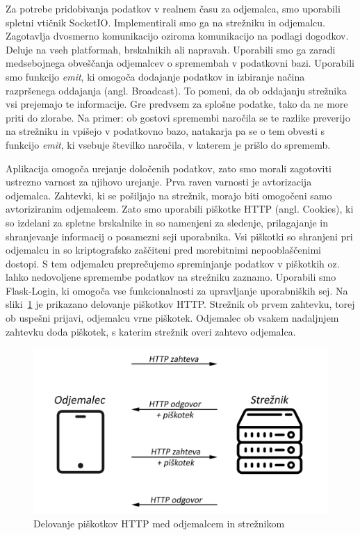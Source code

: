 \documentclass[a4paper, 12pt]{book}
\begin{document}
Za potrebe pridobivanja podatkov v realnem času za odjemalca, smo uporabili spletni vtičnik SocketIO. Implementirali smo ga na strežniku in odjemalcu. Zagotavlja dvosmerno komunikacijo oziroma komunikacijo na podlagi dogodkov. Deluje na vseh platformah, brskalnikih ali napravah. Uporabili smo ga zaradi medsebojnega obveščanja odjemalcev o spremembah v podatkovni bazi. Uporabili smo funkcijo \textit{emit}, ki omogoča dodajanje podatkov in izbiranje načina razpršenega oddajanja (angl. Broadcast). To pomeni, da ob oddajanju strežnika vsi prejemajo te informacije. Gre predvsem za splošne podatke, tako da ne more priti do zlorabe. Na primer: ob gostovi spremembi naročila se te razlike preverijo na strežniku in vpišejo v podatkovno bazo, natakarja pa se o tem obvesti s funkcijo \textit{emit}, ki vsebuje številko naročila, v katerem je prišlo do sprememb. 
	

Aplikacija omogoča urejanje določenih podatkov, zato smo morali zagotoviti ustrezno varnost za njihovo urejanje. Prva raven varnosti je avtorizacija odjemalca. Zahtevki, ki se pošiljajo na strežnik, morajo biti omogočeni samo avtoriziranim odjemalcem. Zato smo uporabili piškotke HTTP (angl. Cookies), ki so izdelani za spletne brskalnike in so namenjeni za sledenje, prilagajanje in shranjevanje informacij o posamezni seji uporabnika. Vsi piškotki so shranjeni pri odjemalcu in so kriptografsko zaščiteni pred morebitnimi nepooblaščenimi dostopi. S tem odjemalcu preprečujemo spreminjanje podatkov v piškotkih oz. lahko nedovoljene spremembe podatkov na strežniku zaznamo. Uporabili smo Flask-Login, ki omogoča vse funkcionalnosti za upravljanje uporabniških sej. 
Na sliki~\ref{Cookies} je prikazano delovanje piškotkov HTTP. Strežnik ob prvem zahtevku, torej ob uspešni prijavi, odjemalcu vrne piškotek. Odjemalec ob vsakem nadaljnjem zahtevku doda piškotek, s katerim strežnik overi zahtevo odjemalca.

\begin{figure}[!htb]
\begin{center}
\includegraphics[width=13.5cm]{cookie-how1.png}
\caption{Delovanje piškotkov HTTP med odjemalcem in strežnikom}
\label{Cookies}
\end{center}
\end{figure}
\end{document}
